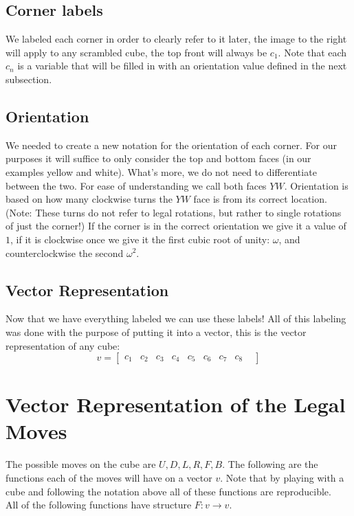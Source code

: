 \documentclass{article}
\begin{document}
\vspace{25mm}

\subsection{Corner labels}
We labeled each corner in order to clearly refer to it later, the image to the right will apply to any scrambled cube, the top front will always be $c_1$. Note that each $c_n$ is a variable that will be filled in with an orientation value defined in the next subsection.
\vspace{20mm}

\subsection{Orientation}
We needed to create a new notation for the orientation of each corner. For our purposes it will suffice to only consider the top and bottom faces (in our examples yellow and white). What's more, we do not need to differentiate between the two. For ease of understanding we call both faces $YW$. Orientation is based on how many clockwise turns the $YW$ face is from its correct location. (Note: These turns do not refer to legal rotations, but rather to single rotations of just the corner!) If the corner is in the correct orientation we give it a value of $1$, if it is clockwise once we give it the first cubic root of unity: $\omega$, and counterclockwise the second $\omega^2$.

\newpage

\subsection{Vector Representation}
Now that we have everything labeled we can use these labels! All of this labeling was done with the purpose of putting it into a vector, this is the vector representation of any cube:
\[ v=
\begin{bmatrix}
c_1 &
c_2 &
c_3 &
c_4 &
c_5 &
c_6 &
c_7 &
c_8 &
\end{bmatrix}
\]


\section{Vector Representation of the Legal Moves}
The possible moves on the cube are ${U,D,L,R,F,B}$. The following are the functions each of the moves will have on a vector $v$. Note that by playing with a cube and following the notation above all of these functions are reproducible.\\ 
All of the following functions have structure $F:v \rightarrow v$.
\end{document}
